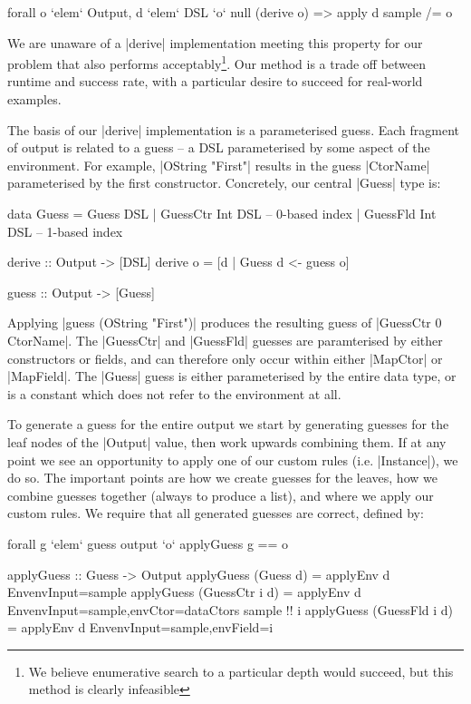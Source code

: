 \documentclass[preprint,draft]{sigplanconf}
\begin{document}
\ignore\begin{code}
forall o `elem` Output, d `elem` DSL `o` null (derive o) => apply d sample /= o
\end{code}

We are unaware of a |derive| implementation meeting this property for our problem that also performs acceptably\footnote{We believe enumerative search to a particular depth would succeed, but this method is clearly infeasible}. Our method is a trade off between runtime and success rate, with a particular desire to succeed for real-world examples.

The basis of our |derive| implementation is a parameterised guess. Each fragment of output is related to a guess -- a DSL parameterised by some aspect of the environment. For example, |OString "First"| results in the guess |CtorName| parameterised by the first constructor. Concretely, our central |Guess| type is:

\begin{code}
data Guess  =  Guess DSL
            |  GuessCtr Int DSL -- 0-based index
            |  GuessFld Int DSL -- 1-based index

derive :: Output -> [DSL]
derive o = [d | Guess d <- guess o]

guess :: Output -> [Guess]
\end{code}

Applying |guess (OString "First")| produces the resulting guess of |GuessCtr 0 CtorName|. The |GuessCtr| and |GuessFld| guesses are paramterised by either constructors or fields, and can therefore only occur within either |MapCtor| or |MapField|. The |Guess| guess is either parameterised by the entire data type, or is a constant which does not refer to the environment at all.

To generate a guess for the entire output we start by generating guesses for the leaf nodes of the |Output| value, then work upwards combining them. If at any point we see an opportunity to apply one of our custom rules (i.e. |Instance|), we do so. The important points are how we create guesses for the leaves, how we combine guesses together (always to produce a list), and where we apply our custom rules. We require that all generated guesses are correct, defined by:

\ignore\begin{code}
forall g `elem` guess output `o` applyGuess g == o
\end{code}
\begin{code}
applyGuess :: Guess -> Output
applyGuess (Guess       d) = applyEnv d
    Env{envInput=sample}
applyGuess (GuessCtr i  d) = applyEnv d
    Env{envInput=sample,envCtor=dataCtors sample !! i}
applyGuess (GuessFld i  d) = applyEnv d
    Env{envInput=sample,envField=i}
\end{code}
\end{document}
